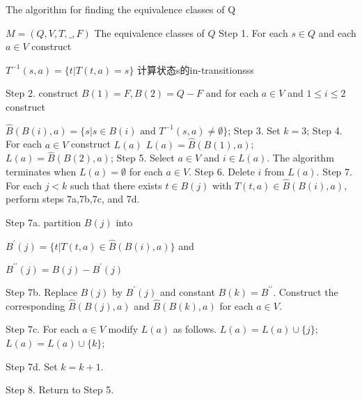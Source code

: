 \begin{algorithm}  
	\caption{The algorithm for finding the equivalence classes of Q}  
	\begin{algorithmic}%
		\Require $M=(Q,V,T,\_,F)$  
		\Ensure The equivalence classes of $Q$  
		\State Step 1. For each $s\in Q$ and each $a\in V$ construct
		
		$T^{-1}(s,a)=\{t|T(t,a)=s\}$ \qquad 计算状态s的in-transitionsss
		
		\State Step 2. construct $B(1)=F, B(2)=Q-F$ and for each $a\in V$ and $1\le i\le 2$ construct
		
				\State $\hat{B}(B(i),a)=\{s|s\in B(i) \text{ and } T^{-1}(s,a)\ne \emptyset\}$;
			\EndFor  
		\EndFor 
		\State Step 3. Set $k=3$;
		\State Step 4. For each $a\in V$ construct $L(a)$
				\State $L(a) = \hat{B}(B(1),a)$;
			\Else
	            \State $L(a) = \hat{B}(B(2),a)$; 
			\EndIf
		\EndFor
		\State Step 5. Select $a\in V$ and $i\in L(a)$. The algorithm terminates when $L(a)=\emptyset$ for each $a\in V$.
		\State Step 6. Delete $i$ from $L(a)$.
		\State Step 7. For each $j<k$ such that there exists $t\in B(j)$ with $T(t,a)\in \hat{B}(B(i),a)$, perform steps 7a,7b,7c, and 7d.
		
		\State Step 7a. partition $B(j)$ into
			
			$B^\prime(j)=\{t|T(t,a)\in \hat{B}(B(i),a)\}$ and			
		
			$B^{\prime\prime}(j)=B(j)-B^\prime(j)$
		
		\State Step 7b. Replace $B(j)$ by $B^\prime(j)$ and constant $B(k)=B^{\prime\prime}$. Construct the corresponding $\hat{B}(B(j),a)$ and $\hat{B}(B(k),a)$ for each $a\in V$.
		
		\State Step 7c. For each $a\in V$ modify $L(a)$ as follows.
				\State $L(a) = L(a)\cup \{j\}$;
			\Else
				\State $L(a) = L(a)\cup \{k\}$;
			\EndIf 
			
		\State Step 7d. Set $k=k+1$.
		
		\State Step 8. Return to Step 5.
	\end{algorithmic}   
\end{algorithm}


